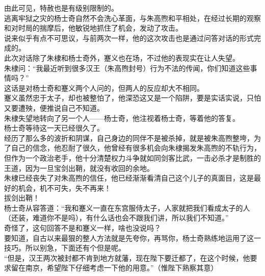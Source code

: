 \begin{multicols}{\theparacolNo}
由此可见，特赦也是有级别限制的。\\

逃离牢狱之灾的杨士奇自然不会洗心革面，与朱高煦和平相处，在经过长期的观察和对时局的揣摩后，他敏锐地抓住了机会，发动了攻击。\\

说来似乎有点不可思议，与前两次一样，他的这次攻击也是通过问答对话的形式完成的。\\

此次对话除了朱棣和杨士奇外，蹇义也在场，不过他的表现实在让人失望。\\

朱棣问：“我最近听到很多汉王（朱高煦封号）行为不法的传闻，你们知道这些事情吗？”\\

这话是对杨士奇和蹇义两个人问的，但两人的反应却大不相同。\\

蹇义虽然忠于太子，却也被整怕了，他深恐这又是一个陷阱，要是实话实说，只怕又要遭殃，便推说自己不知道。\\

朱棣失望地转向了另一个人——杨士奇，他注视着杨士奇，等着他的答复。\\

杨士奇等待这一天已经很久了。\\

经历了那么多的波折和阴谋，自己身边的同伴不是被杀掉，就是被朱高煦整垮，为了自己的信念，他忍耐了很久，他曾经有很多机会向朱棣揭发朱高煦的不轨行为，但作为一个政治老手，他十分清楚权力斗争就如同剑客比武，一击必杀才是制胜的王道，因为一旦宝剑出鞘，就没有收回的余地。\\

朱棣已经丧失了对朱高煦的信任，他已经渐渐看清自己这个儿子的真面目，这是最好的机会，机不可失，失不再来！\\

拔剑出鞘！\\

杨士奇从容答道：“我和蹇义一直在东宫服侍太子，人家就把我们看成太子的人（还装，难道你不是吗），有什么话也会不跟我们讲，所以我们不知道。”\\

奇怪了，这句回答不是和蹇义一样，啥也没说吗？\\

要知道，自古以来最狠的整人方法就是先夸你，再骂你，杨士奇熟练地运用了这一技巧。所以别急，下面还有个但是呢。\\

“但是，汉王两次被封都不肯到地方就藩，现在陛下要迁都了，在这个时候，他要求留在南京，希望陛下仔细考虑一下他的用意。”（惟陛下熟察其意）\\


\end{multicols}

